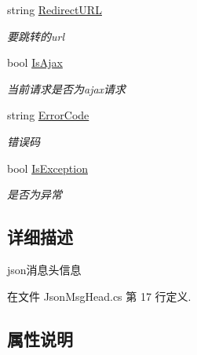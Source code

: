 \begin{DoxyCompactItemize}
string \hyperlink{class_x_c_l_net_tools_1_1_entity_1_1_message_1_1_json_msg_head_aa3e8eb7bf16a7a3abea7e7797488685e}{Redirect\+U\+RL}
\begin{DoxyCompactList}\small\item\em 要跳转的url \end{DoxyCompactList}\item 
bool \hyperlink{class_x_c_l_net_tools_1_1_entity_1_1_message_1_1_json_msg_head_adedb9cb59037071c879572360cebc574}{Is\+Ajax}
\begin{DoxyCompactList}\small\item\em 当前请求是否为ajax请求 \end{DoxyCompactList}\item 
string \hyperlink{class_x_c_l_net_tools_1_1_entity_1_1_message_1_1_json_msg_head_a0f5effef61535ac1a2560f9c47eaea17}{Error\+Code}
\begin{DoxyCompactList}\small\item\em 错误码 \end{DoxyCompactList}\item 
bool \hyperlink{class_x_c_l_net_tools_1_1_entity_1_1_message_1_1_json_msg_head_a5bc768ae54fddb9f46ce313a51b5fc65}{Is\+Exception}
\begin{DoxyCompactList}\small\item\em 是否为异常 \end{DoxyCompactList}\end{DoxyCompactItemize}


\subsection{详细描述}
json消息头信息 



在文件 Json\+Msg\+Head.\+cs 第 17 行定义.



\subsection{属性说明}
\mbox{\label{class_x_c_l_net_tools_1_1_entity_1_1_message_1_1_json_msg_head_ae57b40b25eb4db28d428134d33358c90}} 
